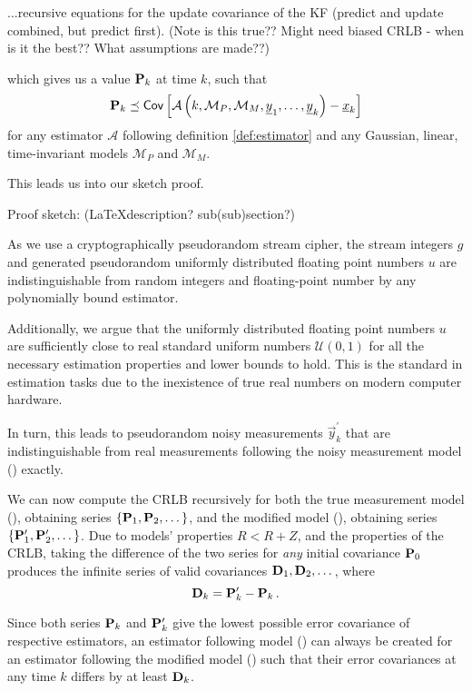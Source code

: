 \documentclass[letterpaper, 10 pt, conference]{IEEEtran}
\theoremstyle{definition}
\theoremstyle{definition}
\theoremstyle{remark}
\begin{document}
...recursive equations for the update covariance of the KF (predict and update combined, but predict first). (Note is this true?? Might need biased CRLB - when is it the best?? What assumptions are made??)

which gives us a value ${{\mathbf{P}}}_k$ at time $k$, such that
\begin{equation}
   {\ensuremath{{\mathbf{P}}}}_k \preceq \mathsf{Cov}\left[\mathcal{A}\left(k, \mathcal{M}_P, \mathcal{M}_M, {\underline{y}}_1,\dots,{\underline{y}}_k\right) - {\underline{x}}_k \right]
\end{equation}
for any estimator $\mathcal{A}$ following definition \ref{def:estimator} and any Gaussian, linear, time-invariant models $\mathcal{M}_P$ and $\mathcal{M}_M$.

This leads us into our sketch proof.

Proof sketch: (LaTeXdescription? sub(sub)section?)

As we use a cryptographically pseudorandom stream cipher, the stream integers $g$ and generated pseudorandom uniformly distributed floating point numbers $u$ are indistinguishable from random integers and floating-point number by any polynomially bound estimator. 

Additionally, we argue that the uniformly distributed floating point numbers $u$ are sufficiently close to real standard uniform numbers $\mathcal{U}(0,1)$ for all the necessary estimation properties and lower bounds to hold. This is the standard in estimation tasks due to the inexistence of true real numbers on modern computer hardware.

In turn, this leads to pseudorandom noisy measurements $\vec{y}^\prime_k$ that are indistinguishable from real measurements following the noisy measurement model () exactly.

We can now compute the CRLB recursively for both the true measurement model (), obtaining series $\{{{\mathbf{P}}}_1,{{\mathbf{P}}}_2,\dots\}$, and the modified model (), obtaining series $\{{{\mathbf{P}}}^\prime_1,{{\mathbf{P}}}^\prime_2,\dots\}$. Due to models' properties $R<R+Z$, and the properties of the CRLB, taking the difference of the two series for \textit{any} initial covariance ${{\mathbf{P}}}_0$ produces the infinite series of valid covariances ${{\mathbf{D}}}_1,{{\mathbf{D}}}_2,\dots$, where
\begin{equation}
   {\ensuremath{{\mathbf{D}}}}_k = {{\mathbf{P}}}^\prime_k - {{\mathbf{P}}}_k\,.
\end{equation}

Since both series ${{\mathbf{P}}}_k$ and ${{\mathbf{P}}}^\prime_k$ give the lowest possible error covariance of respective estimators, an estimator following model () can always be created for an estimator following the modified model () such that their error covariances at any time $k$ differs by at least ${{\mathbf{D}}}_k$.
\end{document}
